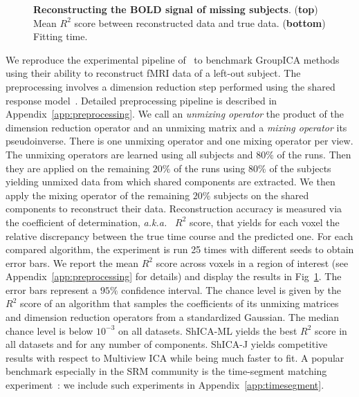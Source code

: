 \documentclass{report}
\newcommand{\aka}{{\em a.k.a.~}}
\begin{document}
{\begin{figure}
  \caption{\textbf{Reconstructing the BOLD signal of
      missing subjects}. (\textbf{top}) Mean $R^2$ score between reconstructed data and true
    data. (\textbf{bottom}) Fitting time.
    }
  \label{fig:reconstruction}
\end{figure}
We reproduce the experimental pipeline of~\cite{richard2020modeling} to benchmark GroupICA methods using their ability to reconstruct fMRI data of a left-out subject.
%
The preprocessing involves a dimension reduction step performed using the shared response model~\cite{chen2015reduced}. Detailed preprocessing pipeline is described in Appendix~\ref{app:preprocessing}. We call an \emph{unmixing operator} the product of the dimension
reduction operator and an unmixing matrix and a \emph{mixing operator} its pseudoinverse. There is one unmixing operator and one mixing operator per view.
The unmixing operators are learned using all subjects
and $80\%$ of the runs. Then they are applied on the remaining $20\%$ of the runs using $80\%$
of the subjects yielding unmixed data from which shared components are extracted. We
then apply the mixing operator of the remaining $20\%$ subjects on the shared components to reconstruct their data.
%
Reconstruction accuracy is measured via the coefficient of determination, \aka
$R^2$ score, that
yields for each voxel the relative discrepancy between the true time course and the predicted one.
%
For each compared algorithm, the experiment is run 25 times with different seeds to obtain error bars. We report the mean $R^2$ score across voxels in a region of interest (see Appendix~\ref{app:preprocessing} for details)
 and display the results in Fig~\ref{fig:reconstruction}. The error bars represent a $95\%$ confidence interval.
The chance level is given by the $R^2$ score of an algorithm that samples the coefficients of its unmixing matrices and dimension reduction operators from a standardized Gaussian. The median chance level is below $10^{-3}$ on all datasets. 
ShICA-ML yields the best $R^2$ score in all datasets and for any number of components. ShICA-J yields competitive results with respect to Multiview ICA while being much faster to fit. A popular benchmark especially in the SRM community is the time-segment matching experiment~\cite{chen2015reduced}: we include such experiments in Appendix~\ref{app:timesegment}.

}
\end{document}
